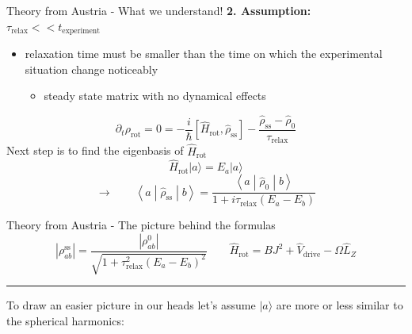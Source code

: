 \begin{frame}{Theory from Austria - What we understand!}
\textbf{2. Assumption:} $\tau_{\mathrm{relax}} << t_{\mathrm{experiment}}$ 
\begin{itemize}
    \item relaxation time must be smaller than the time on which the experimental situation change noticeably
    \begin{itemize}
        \item steady state matrix with no dynamical effects
    \end{itemize}
\end{itemize}
\[
\partial_t \rho_{\mathrm{rot}} = 0 =
-\frac{i}{\hbar}
\left[
\hat{H}_{\mathrm{rot}},\hat{\rho}_{\mathrm{ss}}
\right]
-
\frac{
\hat{\rho}_{\mathrm{ss}}-\hat{\rho}_0
}{
\tau_{\mathrm{relax}}
}
\]
Next step is to find the eigenbasis of $\hat{H}_{\mathrm{rot}}$
\[
\hat{H}_{\mathrm{rot}} | a \rangle = E_{a} | a \rangle
\]
\[
\rightarrow \qquad
\boxed{\left\langle a \middle| \hat{\rho}_{\mathrm{ss}} \middle| b \right\rangle
=
\frac{
\left\langle a \middle| \hat{\rho}_0 \middle| b \right\rangle
}{
1+i\tau_{\mathrm{relax}}
\left(E_a-E_b\right)
}}
\]
\end{frame}
\begin{frame}{Theory from Austria - The picture behind the formulas}
\[\left|\rho^{\mathrm{ss}}_{ab}\right|
=
\frac{
\left|\rho^0_{ab}\right|
}{
\sqrt{
1+
\tau_{\mathrm{relax}}^2
\left(E_a-E_b\right)^2
}
}
\qquad
\hat{H}_{\mathrm{rot}} =
  BJ^2 + \hat{V}_{\mathrm{drive}} - \Omega \hat{L}_Z
\]
\vspace{0.05cm}
\noindent\rule{\linewidth}{0.5pt}
\vspace{0.05cm}
To draw an easier picture in our heads let's assume $| a \rangle$ are more or less similar to the spherical harmonics: 
    
\end{frame}
